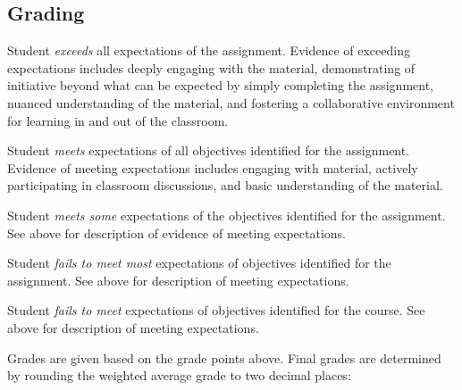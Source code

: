 \subsection{Grading}
\begin{description}
\tightlist
\item[A (4.0)] Student \emph{exceeds} all expectations of the assignment. Evidence of exceeding expectations includes deeply engaging with the material, demonstrating of initiative beyond what can be expected by simply completing the assignment, nuanced understanding of the material, and fostering a collaborative environment for learning in and out of the classroom.
\item[B (3.0)] Student \emph{meets} expectations of all objectives identified for the assignment. Evidence of meeting expectations includes engaging with material, actively participating in classroom discussions, and basic understanding of the material.
\item[C (2.0)] Student \emph{meets some} expectations of the objectives identified for the assignment. See above for description of evidence of meeting expectations.
\item[D (1.0)] Student \emph{fails to meet most} expectations of objectives identified for the assignment. See above for description of meeting expectations.
\item[F (0.0)] Student \emph{fails to meet} expectations of objectives identified for the course. See above for description of meeting expectations.
\end{description}

\noindent Grades are given based on the grade points above. Final grades are determined by rounding the weighted average grade to two decimal places:

